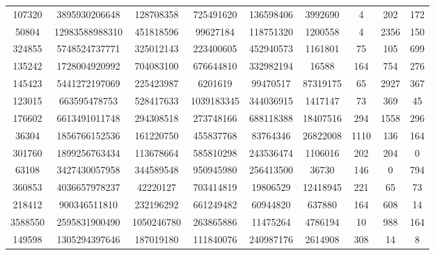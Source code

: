 \documentclass[12pt]{article}
\begin{document}
\begin{tabular}{c | c c c c | c c c c}
107320 & 3895930206648 & 128708358 & 725491620 & 136598406 & 3992690 & 4 & 202 & 172\\
50804 & 12983588988310 & 451818596 & 99627184 & 118751320 & 1200558 & 4 & 2356 & 150\\
324855 & 5748524737771 & 325012143 & 223400605 & 452940573 & 1161801 & 75 & 105 & 699\\
135242 & 1728004920992 & 704083100 & 676644810 & 332982194 & 16588 & 164 & 754 & 276\\
145423 & 5441272197069 & 225423987 & 6201619 & 99470517 & 87319175 & 65 & 2927 & 367\\
123015 & 663595478753 & 528417633 & 1039183345 & 344036915 & 1417147 & 73 & 369 & 45\\
176602 & 6613491011748 & 294308518 & 273748166 & 688118388 & 18407516 & 294 & 1558 & 296\\
36304 & 1856766152536 & 161220750 & 455837768 & 83764346 & 26822008 & 1110 & 136 & 164\\
301760 & 1899256763434 & 113678664 & 585810298 & 243536474 & 1106016 & 202 & 204 & 0\\
63108 & 3427430057958 & 344589548 & 950945980 & 256413500 & 36730 & 146 & 0 & 794\\
360853 & 4036657978237 & 42220127 & 703414819 & 19806529 & 12418945 & 221 & 65 & 73\\
218412 & 900346511810 & 232196292 & 661249482 & 60944820 & 637880 & 164 & 608 & 14\\
3588550 & 2595831900490 & 1050246780 & 263865886 & 11475264 & 4786194 & 10 & 988 & 164\\
149598 & 1305294397646 & 187019180 & 111840076 & 240987176 & 2614908 & 308 & 14 & 8\\
\end{tabular}
\end{document}
